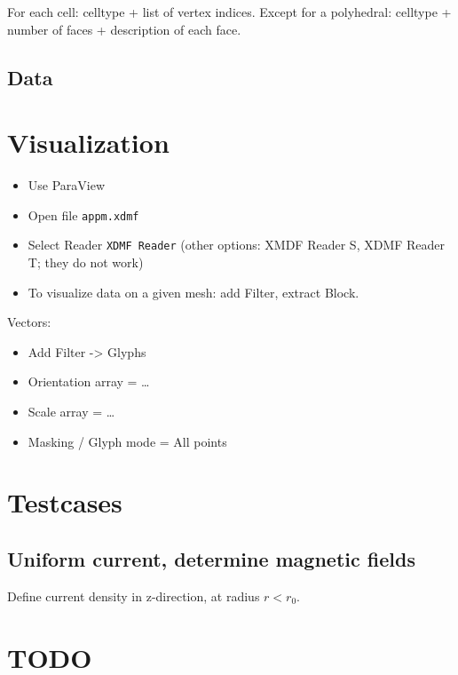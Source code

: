 \documentclass{article}
\begin{document}
For each cell: celltype + list of vertex indices. Except for a polyhedral: celltype + number of faces + description of each face.




\subsection{Data}


\section{Visualization}

\begin{itemize}
\item Use ParaView
\item Open file \texttt{appm.xdmf}
\item Select Reader \texttt{XDMF Reader} (other options: XMDF Reader S, XDMF Reader T; they do not work)

\item To visualize data on a given mesh: add Filter, extract Block.
\end{itemize}


Vectors:

\begin{itemize}
\item Add Filter -> Glyphs
\item Orientation array = \ldots
\item Scale array = \ldots
\item Masking / Glyph mode = All points
\end{itemize}




\section{Testcases}


\subsection{Uniform current, determine magnetic fields}

Define current density in z-direction, at radius $r < r_0$. 





\section{TODO}




\end{document}
